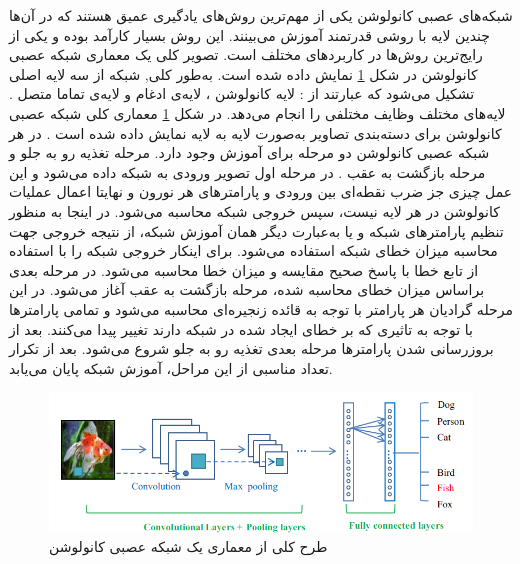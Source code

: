 شبکه‌های عصبی کانولوشن
یکی از مهم‌ترین روش‌های یادگیری عمیق هستند که در آن‌ها چندین لایه با روشی قدرتمند آموزش می‌بینند. این روش بسیار کارآمد بوده و یکی از رایج‌ترین روش‌ها در کاربردهای مختلف است. تصویر کلی یک معماری شبکه عصبی کانولوشن در شکل
\ref{CNNarc} 
نمایش داده شده است. به‌طور کلی, شبکه
از سه لایه اصلی تشکیل می‌شود که عبارتند از : لایه کانولوشن
،
لایه‌ی ادغام
و لایه‌ی تماما متصل
.
لایه‌های مختلف وظایف مختلفی را انجام می‌دهد. در شکل
\ref{CNNarc}
معماری کلی شبکه عصبی کانولوشن برای دسته‌بندی تصاویر به‌صورت لایه به لایه نمایش داده ‌شده ‌است
\cite{A. Krizhevsky2012}.
در هر شبکه عصبی کانولوشن دو مرحله برای آموزش وجود دارد. مرحله تغذیه رو به جلو
و مرحله بازگشت به عقب
.
در مرحله اول تصویر ورودی به شبکه داده می‌شود و این عمل چیزی جز ضرب نقطه‌ای بین ورودی و پارامترهای هر نورون
و نهایتا اعمال عملیات کانولوشن در هر لایه نیست، سپس خروجی شبکه محاسبه می‌شود. در اینجا به منظور تنظیم پارامترهای شبکه و یا به‌عبارت دیگر همان آموزش شبکه، از نتیجه خروجی جهت محاسبه میزان خطای شبکه استفاده می‌شود. برای اینکار خروجی شبکه را با استفاده از تابع خطا
با پاسخ صحیح مقایسه و میزان خطا محاسبه می‌شود. در مرحله بعدی براساس میزان خطای محاسبه شده، مرحله بازگشت به عقب آغاز می‌شود. در این مرحله گرادیان
هر پارامتر با توجه به قائده زنجیره‌ای
محاسبه می‌شود و تمامی پارامترها با توجه به تاثیری که بر خطای ایجاد شده در شبکه دارند تغییر پیدا می‌کنند. بعد از بروزرسانی شدن پارامترها مرحله بعدی تغذیه رو به جلو شروع می‌شود. بعد از تکرار تعداد مناسبی از این مراحل، آموزش شبکه پایان می‌یابد.
  
\begin{figure}[!h]
\centering
\includegraphics[scale=0.72]{section2/CNNarc.png}
	\caption{
طرح کلی از معماری یک شبکه عصبی کانولوشن
\cite{Guo Y2016}}
\label{CNNarc}
\end{figure}
\newpage
